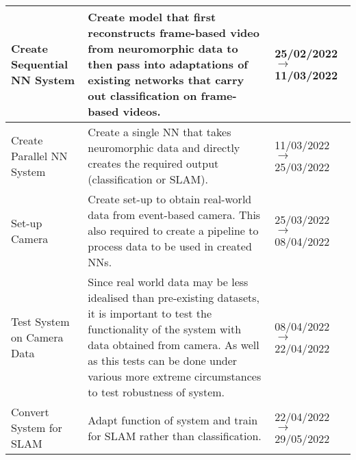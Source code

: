 \begin{longtable}{|| P{0.2\textwidth} | P{.45\textwidth} | P{.15\textwidth} ||}
    \hline
    Create Sequential NN System                          & Create model that first reconstructs frame-based video from neuromorphic data to then pass into adaptations of existing networks that carry out classification on frame-based videos.                                                                                                                                                                                                                                             & 25/02/2022 $ \rightarrow $ 11/03/2022     \\
    \hline
    Create Parallel NN System                            & Create a single NN that takes neuromorphic data and directly creates the required output (classification or SLAM).                                                                                                                                                                                                                                                                                                                & 11/03/2022 $ \rightarrow $ 25/03/2022     \\
    \hline
    Set-up Camera                                        & Create set-up to obtain real-world data from event-based camera. This also required to create a pipeline to process data to be used in created NNs.                                                                                                                                                                                                                                                                               & 25/03/2022 $ \rightarrow $ 08/04/2022     \\
    \hline
    Test System on Camera Data                           & Since real world data may be less idealised than pre-existing datasets, it is important to test the functionality of the system with data obtained from camera. As well as this tests can be done under various more extreme circumstances to test robustness of system.                                                                                                                                                          & 08/04/2022 $ \rightarrow $ 22/04/2022     \\
    \hline
    Convert System for SLAM                              & Adapt function of system and train for SLAM rather than classification.                                                                                                                                                                                                                                                                                                                                                           & 22/04/2022 $ \rightarrow $ 29/05/2022     \\

\end{longtable}
